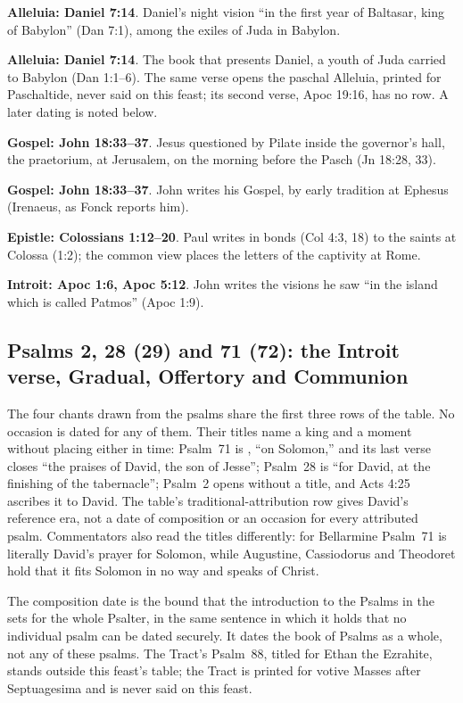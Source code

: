 \noindent\textbf{Alleluia: Daniel 7:14}. Daniel's night vision ``in the first year of Baltasar, king of Babylon'' (Dan 7:1), among the exiles of Juda in Babylon.

\noindent\textbf{Alleluia: Daniel 7:14}. The book that presents Daniel, a youth of Juda carried to Babylon (Dan 1:1--6). The same verse opens the paschal Alleluia, printed for Paschaltide, never said on this feast; its second verse, Apoc 19:16, has no row. A later dating is noted below.

\noindent\textbf{Gospel: John 18:33--37}. Jesus questioned by Pilate inside the governor's hall, the praetorium, at Jerusalem, on the morning before the Pasch (Jn 18:28, 33).

\noindent\textbf{Gospel: John 18:33--37}. John writes his Gospel, by early tradition at Ephesus (Irenaeus, as Fonck reports him).

\noindent\textbf{Epistle: Colossians 1:12--20}. Paul writes in bonds (Col 4:3, 18) to the saints at Colossa (1:2); the common view places the letters of the captivity at Rome.

\noindent\textbf{Introit: Apoc 1:6, Apoc 5:12}. John writes the visions he saw ``in the island which is called Patmos'' (Apoc 1:9).


\subsection{Psalms 2, 28 (29) and 71 (72): the Introit verse, Gradual, Offertory and Communion}
\label{sec:date-psalms}

The four chants drawn from the psalms share the first three rows of the table.
No occasion is dated for any of them. Their titles
name a king and a moment without placing either in time: Psalm~71 is , ``on Solomon,'' and its last verse closes ``the praises of David,
the son of Jesse''; Psalm~28 is ``for David, at the finishing of the
tabernacle''; Psalm~2 opens without a title, and Acts 4:25 ascribes it to
David. The table's traditional-attribution row gives David's reference era,
not a date of composition or an occasion for every attributed psalm.
Commentators also read
the titles differently: for Bellarmine Psalm~71 is
literally David's prayer for Solomon, while Augustine, Cassiodorus and
Theodoret hold that it fits Solomon in no way and speaks of Christ.

The composition date is the bound that the introduction to the Psalms in the
 sets for the whole Psalter, in the
same sentence in which it holds that no individual psalm can be dated securely.
It dates the book of Psalms as a whole, not any of these psalms. The
Tract's Psalm~88, titled for Ethan the Ezrahite, stands outside this feast's
table; the Tract is printed
for votive Masses after Septuagesima and is never said on this feast.

